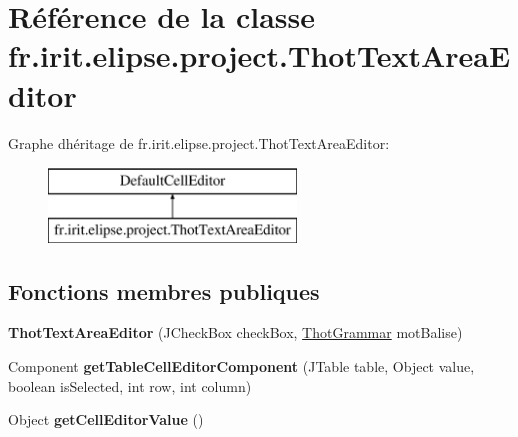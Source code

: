 \hypertarget{classfr_1_1irit_1_1elipse_1_1project_1_1_thot_text_area_editor}{}\section{Référence de la classe fr.\+irit.\+elipse.\+project.\+Thot\+Text\+Area\+Editor}
\label{classfr_1_1irit_1_1elipse_1_1project_1_1_thot_text_area_editor}
Graphe d\textquotesingle{}héritage de fr.\+irit.\+elipse.\+project.\+Thot\+Text\+Area\+Editor\+:\begin{figure}[H]
\begin{center}
\leavevmode
\includegraphics[height=2.000000cm]{classfr_1_1irit_1_1elipse_1_1project_1_1_thot_text_area_editor}
\end{center}
\end{figure}
\subsection*{Fonctions membres publiques}
\begin{DoxyCompactItemize}
\item 
\mbox{\label{classfr_1_1irit_1_1elipse_1_1project_1_1_thot_text_area_editor_a13be8c358ca69e43493f7b4a797f91b2}} 
{\bfseries Thot\+Text\+Area\+Editor} (J\+Check\+Box check\+Box, \mbox{\hyperlink{classfr_1_1irit_1_1elipse_1_1project_1_1_thot_grammar}{Thot\+Grammar}} mot\+Balise)
\item 
\mbox{\label{classfr_1_1irit_1_1elipse_1_1project_1_1_thot_text_area_editor_a0eeb920086c7fe481ea27956bac8642e}} 
Component {\bfseries get\+Table\+Cell\+Editor\+Component} (J\+Table table, Object value, boolean is\+Selected, int row, int column)
\item 
\mbox{\label{classfr_1_1irit_1_1elipse_1_1project_1_1_thot_text_area_editor_a9ecc0a65b23e5937e921463293a8aa66}} 
Object {\bfseries get\+Cell\+Editor\+Value} ()
\end{DoxyCompactItemize}
